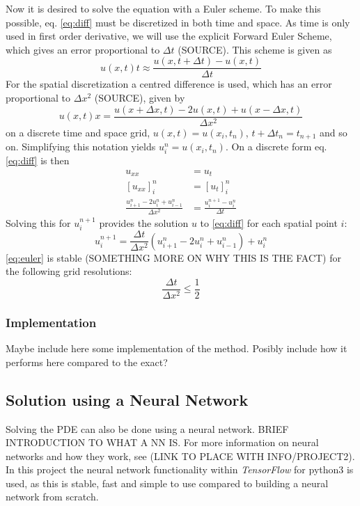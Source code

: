 \documentclass[a4paper,11pt,twocolumn]{article}
\begin{document}
Now it is desired to solve the equation with a Euler scheme. To make this possible, eq. \eqref{eq:diff} must be discretized in both time and space. As time is only used in first order derivative, we will use the explicit Forward Euler Scheme, which gives an error proportional to $\Delta t$ (SOURCE). This scheme is given as
\begin{equation}
  {u(x,t)}{t} \approx \frac{u(x,t+\Delta t) - u(x,t)}{\Delta t}
    \label{eq:foreward}
\end{equation}
For the spatial discretization a centred difference is used, which has an error proportional to $\Delta x^2$ (SOURCE), given by
\begin{equation}
 {u(x,t)}{x} = \frac{u(x+\Delta x,t) - 2u(x,t) + u(x-\Delta x,t)}{\Delta x^2}
    \label{eq:centerd}
\end{equation}
on a discrete time and space grid, $u(x,t) = u(x_i,t_n)$, $t+\Delta t_n = t_{n+1}$ and so on.
Simplifying this notation yields $u_i^n = u(x_i,t_n)$. On a discrete form eq. \eqref{eq:diff} is then 
\begin{equation}
\begin{split}
    u_{xx} &= u_t \\
    [u_{xx}]_i^n &= [u_t]_i^n \\
    \frac{u_{i+1}^n - 2u_i^n + u_{i-1}^n}{\Delta x^2} &= \frac{u_i^{n+1}-u_i^n}{\Delta t}
\end{split}
\end{equation}
Solving this for $u_i^{n+1}$ provides the solution $u$ to \eqref{eq:diff} for each spatial point $i$:
\begin{equation}
    u_i^{n+1} = \frac{\Delta t}{\Delta x^2}(u_{i+1}^n - 2u_i^n + u_{i-1}^n)  + u_i^n
    \label{eq:euler}
\end{equation}
\eqref{eq:euler} is stable (SOMETHING MORE ON WHY THIS IS THE FACT) for the following grid resolutions:
\begin{equation*}
    \frac{\Delta t}{\Delta x^2} \leq \frac{1}{2}
\end{equation*}

\subsubsection{Implementation}
Maybe include here some implementation of the method. 
Posibly include how it performs here compared to the exact? 
\subsection{Solution using a Neural Network}
Solving the PDE can also be done using a neural network. BRIEF INTRODUCTION TO WHAT A NN IS. For more information on neural networks and how they work, see (LINK TO PLACE WITH INFO/PROJECT2). In this project the neural network functionality within \textit{TensorFlow} for python3 is used, as this is stable, fast and simple to use compared to building a neural network from scratch. 
\end{document}
